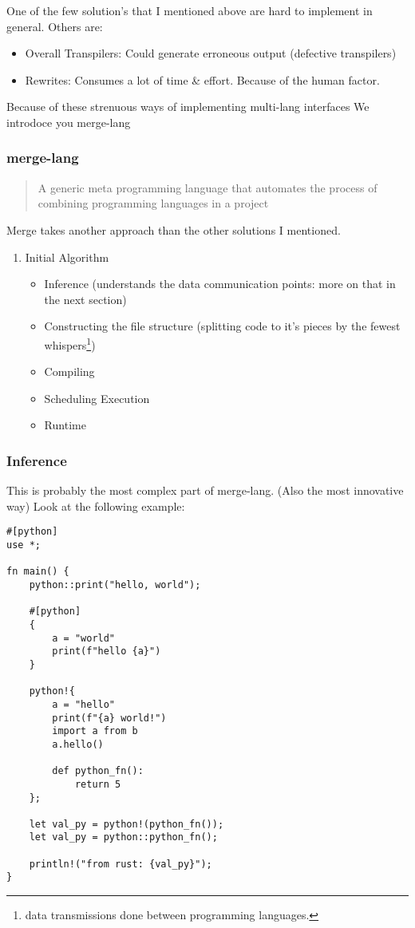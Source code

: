\documentclass[9pt,twocolumn]{article}
\begin{document}
One of the few solution's that I mentioned above are hard to implement in general. Others are:

\begin{itemize}
\item Overall Transpilers: Could generate erroneous output (defective transpilers)
\item Rewrites: Consumes a lot of time \& effort. Because of the human factor.
\end{itemize}

Because of these strenuous ways of implementing multi-lang interfaces We introdoce you merge-lang

\subsubsection{merge-lang}
\label{sec:org2ab91df}
\begin{quote}
A generic meta programming language that automates the process of combining programming languages in a project
\end{quote}

Merge takes another approach than the other solutions I mentioned.

\begin{enumerate}
\item Initial Algorithm
\label{sec:orgb33f27b}
\begin{itemize}
\item Inference (understands the data communication points: more on that in the next section)
\item Constructing the file structure (splitting code to it's pieces by the fewest whispers\footnote{data transmissions done between programming languages.})
\item Compiling
\item Scheduling Execution
\item Runtime
\end{itemize}
\end{enumerate}


\subsubsection{Inference}
\label{sec:orge0cc3f8}
This is probably the most complex part of merge-lang. (Also the most innovative way)
Look at the following example:

\begin{verbatim}
#[python]
use *;

fn main() {
    python::print("hello, world");

    #[python]
    {
        a = "world"
        print(f"hello {a}")
    }

    python!{
        a = "hello"
        print(f"{a} world!")
        import a from b
        a.hello()

        def python_fn():
            return 5
    };

    let val_py = python!(python_fn());
    let val_py = python::python_fn();

    println!("from rust: {val_py}");
}
\end{verbatim}
\end{document}
